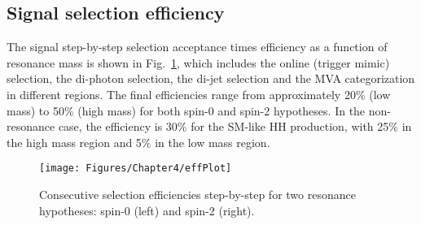 \subsection{Signal selection efficiency}

The signal step-by-step selection acceptance times efficiency as a function of resonance mass is shown in Fig.~\ref{fig:effPlot}, which includes the online (trigger mimic) selection, the di-photon selection, the di-jet selection and the MVA categorization in different regions.
The final efficiencies range from approximately 20\% (low mass) to 50\% (high mass) for both spin-0 and spin-2 hypotheses.
In the non-resonance case, the efficiency is 30\% for the SM-like HH production, with 25\% in the high mass region and 5\% in the low mass region.


\begin{figure}[h]
  \centering
  \texttt{[image: Figures/Chapter4/effPlot]}
  \caption{Consecutive selection efficiencies step-by-step for two resonance hypotheses: spin-0 (left) and spin-2 (right).}
  \label{fig:effPlot}
\end{figure}
